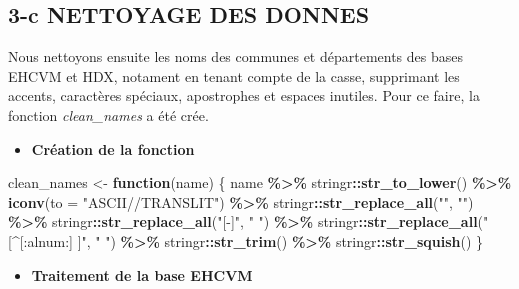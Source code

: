 \documentclass[
]{article}
\newenvironment{Shaded}{\begin{snugshade}}{\end{snugshade}}
\newcommand{\AttributeTok}[1]{\textcolor[rgb]{0.13,0.29,0.53}{#1}}
\newcommand{\ControlFlowTok}[1]{\textcolor[rgb]{0.13,0.29,0.53}{\textbf{#1}}}
\newcommand{\FunctionTok}[1]{\textcolor[rgb]{0.13,0.29,0.53}{\textbf{#1}}}
\newcommand{\NormalTok}[1]{#1}
\newcommand{\OtherTok}[1]{\textcolor[rgb]{0.56,0.35,0.01}{#1}}
\newcommand{\SpecialCharTok}[1]{\textcolor[rgb]{0.81,0.36,0.00}{\textbf{#1}}}
\newcommand{\StringTok}[1]{\textcolor[rgb]{0.31,0.60,0.02}{#1}}
\providecommand{\tightlist}{%
  \setlength{\itemsep}{0pt}\setlength{\parskip}{0pt}}
\begin{document}
\subsection{3-c NETTOYAGE DES DONNES}\label{c-nettoyage-des-donnes}

Nous nettoyons ensuite les noms des communes et départements des bases
EHCVM et HDX, notament en tenant compte de la casse, supprimant les
accents, caractères spéciaux, apostrophes et espaces inutiles. Pour ce
faire, la fonction \emph{clean\_names} a été crée.

\begin{itemize}
\tightlist
\item
  \textbf{Création de la fonction}
\end{itemize}

\begin{Shaded}
\begin{Highlighting}[]
\NormalTok{clean\_names }\OtherTok{\textless{}{-}} \ControlFlowTok{function}\NormalTok{(name) \{}
\NormalTok{  name }\SpecialCharTok{\%\textgreater{}\%}
\NormalTok{    stringr}\SpecialCharTok{::}\FunctionTok{str\_to\_lower}\NormalTok{() }\SpecialCharTok{\%\textgreater{}\%}
    \FunctionTok{iconv}\NormalTok{(}\AttributeTok{to =} \StringTok{"ASCII//TRANSLIT"}\NormalTok{) }\SpecialCharTok{\%\textgreater{}\%} 
\NormalTok{    stringr}\SpecialCharTok{::}\FunctionTok{str\_replace\_all}\NormalTok{(}\StringTok{"\textquotesingle{}"}\NormalTok{, }\StringTok{""}\NormalTok{) }\SpecialCharTok{\%\textgreater{}\%}
\NormalTok{    stringr}\SpecialCharTok{::}\FunctionTok{str\_replace\_all}\NormalTok{(}\StringTok{"[{-}]"}\NormalTok{, }\StringTok{" "}\NormalTok{) }\SpecialCharTok{\%\textgreater{}\%}
\NormalTok{    stringr}\SpecialCharTok{::}\FunctionTok{str\_replace\_all}\NormalTok{(}\StringTok{"[\^{}[:alnum:] ]"}\NormalTok{, }\StringTok{" "}\NormalTok{) }\SpecialCharTok{\%\textgreater{}\%}
\NormalTok{    stringr}\SpecialCharTok{::}\FunctionTok{str\_trim}\NormalTok{() }\SpecialCharTok{\%\textgreater{}\%}
\NormalTok{    stringr}\SpecialCharTok{::}\FunctionTok{str\_squish}\NormalTok{()}
\NormalTok{\}}
\end{Highlighting}
\end{Shaded}

\begin{itemize}
\tightlist
\item
  \textbf{Traitement de la base EHCVM}
\end{itemize}
\end{document}
